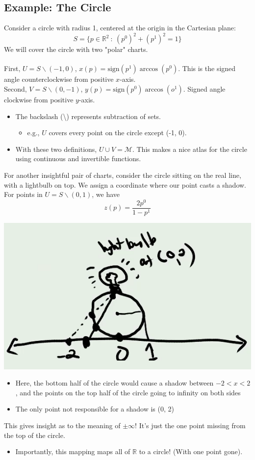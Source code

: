 \documentclass[10pt]{article}
\newcommand{\R}{\mathbb{R}}
\begin{document}
\subsection*{Example: The Circle}
Consider a circle with radius 1, centered at the origin in the Cartesian plane:
\[S = \{p \in \R^2\::\: (p^0)^2 + (p^1)^2 = 1\}\]
We will cover the circle with two "polar" charts.\\\\
First, $U = S \backslash (-1, 0)$, $x(p) = \text{sign}(p^1) \arccos(p^0)$.  This is the signed angle counterclockwise from positive $x$-axis.\\
Second, $V = S \backslash (0, -1)$, $y(p) = \text{sign}(p^0) \arccos(o^1)$.  Signed angle clockwise from positive $y$-axis.
\begin{itemize}
    \item The backslash (\textbackslash) represents subtraction of sets.
    \begin{itemize}
        \item e.g., $U$ covers every point on the circle except (-1, 0).
    \end{itemize}
    \item With these two definitions, $U \cup V = \mathcal{M}$.  This makes a nice atlas for the circle using continuous and invertible functions.
\end{itemize}
For another insightful pair of charts, consider the circle sitting on the real line, with a lightbulb on top.  We assign a coordinate where our point casts a shadow.  For points in $U = S \backslash (0, 1)$, we have
\[z(p) = \frac{2p^0}{1 - p^1}\]
\begin{center}
    \includegraphics*[scale=0.9]{W4_4.png}
\end{center}
\begin{itemize}
    \item Here, the bottom half of the circle would cause a shadow between $-2 < x < 2$, and the points on the top half of the circle going to infinity on both sides
    \item The only point not responsible for a shadow is (0, 2)
\end{itemize}
This gives insight as to the meaning of $\pm \infty$!  It's just the one point missing from the top of the circle.
\begin{itemize}
    \item Importantly, this mapping maps all of $\mathbb{R}$ to a circle!  (With one point gone).
\end{itemize}
\end{document}
